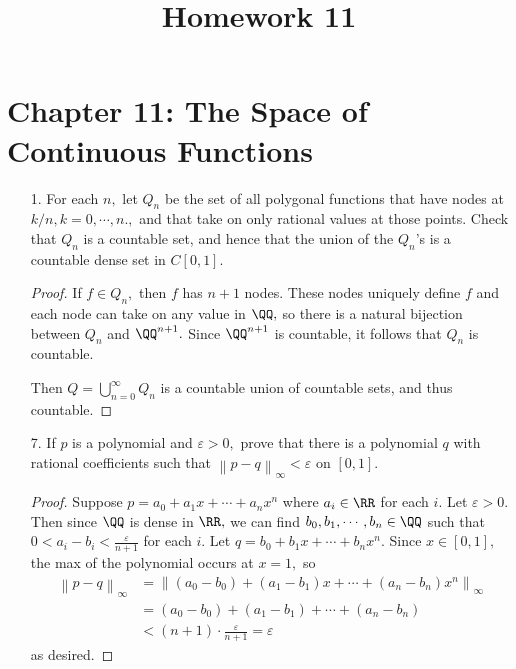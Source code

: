 \documentclass{article}
\begin{document}
\title{Homework 11}
\maketitle
\thispagestyle{fancy}

\section*{Chapter 11: The Space of Continuous Functions}

\begin{itemize}
	\item[1.] For each $n,$ let $Q_n$ be the set of all polygonal functions that have nodes at $k/n, k=0, \cdots, n.,$ and that take on only rational values at those points. Check that $Q_n$ is a countable set, and hence that the union of the $Q_n$'s is a countable dense set in $C[0, 1].$
		\begin{proof}
			If $f\in Q_n,$ then $f$ has $n+1$ nodes. These nodes uniquely define $f$ and each node can take on any value in $\QQ,$ so there is a natural bijection between $Q_n$ and $\QQ^{n+1}.$ Since $\QQ^{n+1}$ is countable, it follows that $Q_n$ is countable.

			Then $Q=\bigcup_{n=0}^\infty Q_n$ is a countable union of countable sets, and thus countable.
		\end{proof}

	\item[7.] If $p$ is a polynomial and $\varepsilon>0,$ prove that there is a polynomial $q$ with rational coefficients such that $\left\lVert p-q \right\rVert_\infty<\varepsilon$ on $[0, 1].$
		\begin{proof}
			Suppose $p=a_0+a_1x+\cdots+a_n x^n$ where $a_i\in\RR$ for each $i.$ Let $\varepsilon>0.$ Then since $\QQ$ is dense in $\RR,$ we can find $b_0, b_1, \cdots, b_n\in\QQ$ such that $0<a_i-b_i<\frac{\varepsilon}{n+1}$ for each $i.$ Let $q=b_0+b_1x+\cdots+b_n x^n.$ Since $x\in[0, 1],$ the max of the polynomial occurs at $x=1,$ so
			\begin{align*}
				\left\lVert p-q \right\rVert_\infty &= \left\lVert (a_0-b_0) + (a_1-b_1)x+\cdots+(a_n-b_n)x^n \right\rVert_\infty \\
				&= (a_0-b_0) + (a_1-b_1)+\cdots+(a_n-b_n) \\
				&< (n+1)\cdot \frac{\varepsilon}{n+1} = \varepsilon
			\end{align*}
			as desired.
		\end{proof}


\end{itemize}
\end{document}

